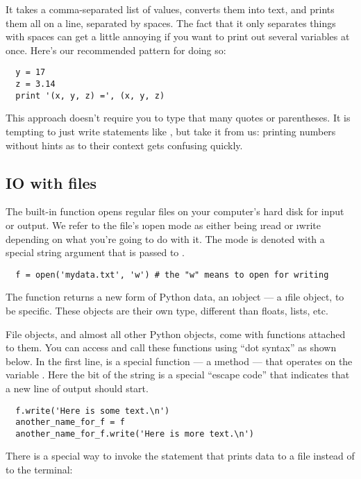 \documentclass[letterpaper, 12pt, titlepage, twoside]{article}
\begin{document}
It takes a comma-separated list of values, converts them into text, and prints
them all on a line, separated by spaces. The fact that it only separates
things with spaces can get a little annoying if you want to print out several
variables at once. Here's our recommended pattern for doing so:

\begin{lstlisting}
  y = 17
  z = 3.14
  print '(x, y, z) =', (x, y, z)
\end{lstlisting}

This approach doesn't require you to type that many quotes or parentheses. It
is tempting to just write statements like , but take it from
us: printing numbers without hints as to their context gets confusing quickly.

\subsection*{IO with files}

The built-in  function opens regular files on your computer's hard
disk for input or output. We refer to the file's \i{open mode} as either being
\i{read} or \i{write} depending on what you're going to do with it. The mode
is denoted with a special string argument that is passed to .

\begin{lstlisting}
  f = open('mydata.txt', 'w') # the "w" means to open for writing
\end{lstlisting}

The  function returns a new form of Python data, an \i{object} --- a
\i{file object}, to be specific. These objects are their own type, different
than floats, lists, etc.

File objects, and almost all other Python objects, come with functions
attached to them. You can access and call these functions using ``dot syntax''
as shown below. In the first line,  is a special function --- a
\i{method} --- that operates on the variable . Here the
 bit of the string is a special ``escape code'' that
indicates that a new line of output should start.

\begin{lstlisting}
  f.write('Here is some text.\n')
  another_name_for_f = f
  another_name_for_f.write('Here is more text.\n')
\end{lstlisting}

There is a special way to invoke the  statement that prints data to a
file instead of to the terminal:
\end{document}

